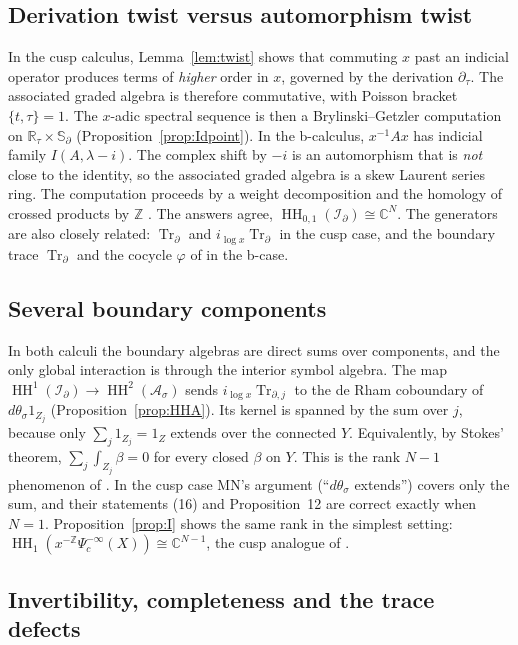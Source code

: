 \documentclass[11pt,oneside,reqno]{article}
\DeclareMathOperator{\HH}{HH}
\DeclareMathOperator{\Tr}{Tr}
\newcommand{\C}{\mathbb C}
\newcommand{\R}{\mathbb R}
\newcommand{\Z}{\mathbb Z}
\newcommand{\Id}{\mathcal I_\partial}
\newcommand{\As}{\mathcal A_\sigma}
\newcommand{\Psic}{\Psi_{c}}
\newcommand{\Trd}{\Tr_\partial}
\newcommand{\Sd}{\mathbb S_\partial}
\newcommand{\lx}{\log x}
\theoremstyle{plain}
\theoremstyle{definition}
\theoremstyle{remark}
\begin{document}
\subsection{Derivation twist versus automorphism twist}
In the cusp calculus, Lemma~\ref{lem:twist} shows that commuting \(x\) past
an indicial operator produces terms of \emph{higher} order in \(x\),
governed by the derivation \(\partial_\tau\). The associated graded
algebra is therefore commutative, with Poisson bracket \(\{t,\tau\}=1\).
The \(x\)-adic spectral sequence is then a Brylinski--Getzler computation on
\(\R_\tau\times\Sd\) (Proposition~\ref{prop:Idpoint}). In the b-calculus,
\(x^{-1}Ax\) has indicial family \(I(A,\lambda-i)\). The complex shift by
\(-i\) is an automorphism that is \emph{not} close to the identity, so the
associated graded algebra is a skew Laurent series ring. The
computation proceeds by a weight decomposition and the homology of crossed
products by \(\Z\) \cite[\S``The boundary ideal'']{HHb}. The answers agree,
\(\HH_{0,1}(\Id)\cong\C^N\). The generators are also closely related:
\(\Trd\) and \(i_{\lx}\Trd\) in the cusp case, and the boundary trace
\(\Tr_\partial\) and the cocycle \(\varphi\) of \cite{HHb} in the b-case.

\subsection{Several boundary components}
In both calculi the boundary algebras are direct sums over components,
and the only global interaction is through the interior symbol algebra.
The map \(\HH^1(\Id)\to\HH^2(\As)\) sends \(i_{\lx}\Tr_{\partial,j}\) to
the de Rham coboundary of \(d\theta_\sigma1_{Z_j}\)
(Proposition~\ref{prop:HHA}). Its kernel is spanned by the sum over \(j\),
because only \(\sum_j1_{Z_j}=1_Z\) extends over the connected \(Y\).
Equivalently, by Stokes' theorem, \(\sum_j\int_{Z_j}\beta=0\) for every
closed \(\beta\) on \(Y\). This is the rank \(N-1\) phenomenon of
\cite[Remark ``Several boundary components'']{HHb}. In the cusp case MN's
argument (``\(d\theta_\sigma\) extends'') covers only the sum, and their
statements (16) and Proposition~12 are correct exactly when \(N=1\).
Proposition~\ref{prop:I} shows the same rank in the simplest setting:
\(\HH_1(x^{-\Z}\Psic^{-\infty}(X))\cong\C^{N-1}\), the cusp analogue of
\cite[Thm., part (iii)]{HHb}.

\subsection{Invertibility, completeness and the trace defects}
\end{document}
